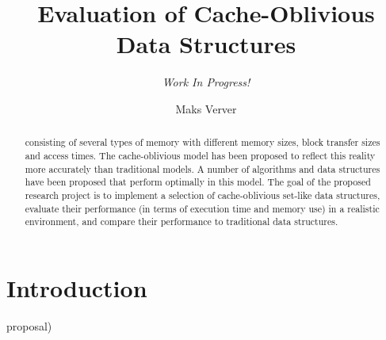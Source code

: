 \documentclass{acm_proc_article-sp}
\begin{document}
\title{Evaluation of Cache-Oblivious Data Structures}
\subtitle{\textit{Work In Progress!}}

\author{Maks Verver\\ }


\maketitle

\begin{abstract}
consisting of several types of memory with different memory sizes, block
transfer sizes and access times. The cache-oblivious model has been proposed
to reflect this reality more accurately than traditional models. A number of
algorithms and data structures have been proposed that perform optimally in
this model. The goal of the proposed research project is to implement a
selection of cache-oblivious set-like data structures, evaluate their
performance (in terms of execution time and memory use) in a realistic
environment, and compare their performance to traditional data structures.
\end{abstract}



\section{Introduction}
proposal)
\end{document}
